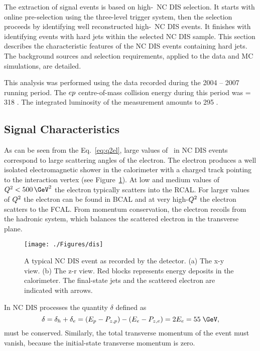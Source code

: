 The extraction of signal events is based on high-\qsq\, NC DIS selection. It starts with online pre-selection using the three-level trigger system, then the selection proceeds by identifying well reconstructed high-\qsq\, NC DIS events. It finishes with identifying events with hard jets within the selected NC DIS sample. This section describes the characteristic features of the NC DIS events containing hard jets. The background sources and selection requirements, applied to the data and MC simulations, are detailed.

This analysis was performed using the data recorded during the 2004 -- 2007 running period. The $\mbox{$e p$}$ centre-of-mass collision energy during this period was \sqs = 318 \GeV. The integrated luminosity of the measurement amounts to 295 \invpb.

\subsection{Signal Characteristics}
\label{subsec:signalchar}
As can be seen from the Eq.~\ref{eq:q2el}, large values of \qsq\, in NC DIS events correspond to large scattering angles of the electron. The electron produces a well isolated electromagnetic shower in the calorimeter with a charged track pointing to the interaction vertex (see Figure~\ref{fig:ncdiseventdisplay}). At low and medium values of $\qsq < 500\, \GeV^2$ the electron typically scatters into the RCAL. For larger values of $\mbox{${Q^2}$}$ the electron can be found in BCAL and at very high-$\mbox{${Q^2}$}$ the electron scatters to the FCAL. From momentum conservation, the electron recoils from the hadronic system, which balances the scattered electron in the transverse plane.
\begin{figure}[htbp]
	\centering
	\texttt{[image: ./Figures/dis]} 
	\caption{A typical NC DIS event as recorded by the \zeus detector. (a) The x-y view. (b) The z-r view. Red blocks represents energy deposits in the calorimeter. The final-state jets and the scattered electron are indicated with arrows.}
	\label{fig:ncdiseventdisplay}
\end{figure}
In NC DIS processes the quantity $\delta$ defined as
\begin{equation}
\delta = \delta_h + \delta_e = \left( E_p - P_{z,p} \right) - \left( E_e - P_{z,e}\right) = 2E_e = 55\;\GeV,
\label{eq:deltadis}
\end{equation}
must be conserved. Similarly, the total transverse momentum of the event must vanish, because the initial-state transverse momentum is zero.

